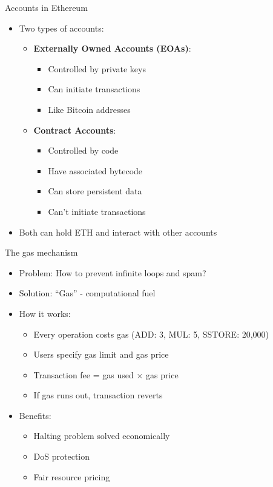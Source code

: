 \documentclass[aspectratio=169, lualatex, handout]{beamer}
\begin{document}
\begin{frame}{Accounts in Ethereum}
	\begin{itemize}
		\item Two types of accounts:
		      \begin{itemize}
			      \item \textbf{Externally Owned Accounts (EOAs)}:
			            \begin{itemize}
				            \item Controlled by private keys
				            \item Can initiate transactions
				            \item Like Bitcoin addresses
			            \end{itemize}
			      \item \textbf{Contract Accounts}:
			            \begin{itemize}
				            \item Controlled by code
				            \item Have associated bytecode
				            \item Can store persistent data
				            \item Can't initiate transactions
			            \end{itemize}
		      \end{itemize}
		\item Both can hold ETH and interact with other accounts
	\end{itemize}
\end{frame}

\begin{frame}{The gas mechanism}
	\begin{itemize}
		\item Problem: How to prevent infinite loops and spam?
		\item Solution: ``Gas'' - computational fuel
		\item How it works:
		      \begin{itemize}
			      \item Every operation costs gas (ADD: 3, MUL: 5, SSTORE: 20,000)
			      \item Users specify gas limit and gas price
			      \item Transaction fee = gas used × gas price
			      \item If gas runs out, transaction reverts
		      \end{itemize}
		\item Benefits:
		      \begin{itemize}
			      \item Halting problem solved economically
			      \item DoS protection
			      \item Fair resource pricing
		      \end{itemize}
	\end{itemize}
\end{frame}
\end{document}
